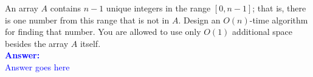 \item{}
An array $A$ contains $n-1$ unique integers in the range $[0,n-1]$; that is,
there is one number from this range that is not in $A$. Design an $O(n)$-time
algorithm for finding that number. You are allowed to use only $O(1)$ additional
space besides the array $A$ itself.\\[12pt]
\ifanswers
\textcolor{blue}{
\textbf{Answer:}\\[6pt]
Answer goes here
}
\newpage
\fi

